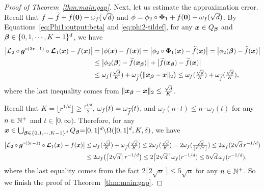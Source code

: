 \documentclass[nohyperref]{article}
\theoremstyle{plain}
\theoremstyle{definition}
\theoremstyle{remark}
\begin{document}
\begin{proof}[Proof of Theorem~\ref{thm:main:gap}]
Next, let us estimate the approximation error.
Recall that $f={\widetilde{f}}+f({\bm{0}})-\omega_f(\sqrt{d})$
 and $\phi=\phi_2\circ{\bm{\Phi}}_1+f({\bm{0}})-\omega_f(\sqrt{d})$. 
By Equations~\eqref{eq:Phi1:output:beta} and \eqref{eq:phi2-tildef}, for any ${\bm{x}}\in Q_{\bm{\beta}}$ and $\bmbeta\in \{0,1,\dotsc,K-1\}^d$, we have
\begin{equation*}
	\begin{split}
		\big|{\mathcal{L}}_2\circ {\bm{g}}^{\circ (3r-1)}\circ {\bm{\mathcal{L}}}_1({\bm{x}})-f({\bm{x}})\big|
		&=|\phi({\bm{x}})-f({\bm{x}})|
		=\big|\phi_2\circ{\bm{\Phi}}_1({\bm{x}})-{\widetilde{f}}({\bm{x}})\big|=\big|\phi_2({\bm{\beta}})-{\widetilde{f}}({\bm{x}})\big|\\
		&\le \big|\phi_2({\bm{\beta}})-{\widetilde{f}}({\bm{x}}_{\bm{\beta}})\big|+ \big|{\widetilde{f}}({\bm{x}}_{\bm{\beta}})-{\widetilde{f}}({\bm{x}})\big|\\
		&\le \omega_f(\tfrac{\sqrt{d}}{K})
		+\omega_{\widetilde{f}}\big(\|{\bm{x}}_{\bm{\beta}}-{\bm{x}}\|_2\big)
		\le   \omega_f(\tfrac{\sqrt{d}}{K}) + \omega_{\widetilde{f}}(\tfrac{\sqrt{d}}{K}),
	\end{split}
\end{equation*}
where the last inequality comes from $\|{\bm{x}}_{\bm{\beta}}-{\bm{x}}\|_2\le \tfrac{\sqrt{d}}{K}$.


Recall that  $K=\lfloor r^{1/d}\rfloor \ge    \tfrac{r^{1/d}}{2}$,  $\omega_f(t)=\omega_{\widetilde{f}}(t)$, and $\omega_f(n\cdot  t)\le n\cdot \omega_f(t)$ for any $n\in\N^+$ and $t\in [0,\infty)$. Therefore, for any $\bmx\in \bigcup_{\bm{\beta}\in \{0,1,\dotsc,K-1\}^d} Q_\bmbeta\black{=} [0,1]^d\backslash \Omega([0,1]^d,K,\delta)$, we have
\begin{equation*}
	\begin{split}
		\big|{\mathcal{L}}_2\circ {\bm{g}}^{\circ (3r-1)}\circ {\bm{\mathcal{L}}}_1({\bm{x}})-f({\bm{x}})\big|
		&\le  \omega_f(\tfrac{\sqrt{d}}{K}) + \omega_{\widetilde{f}}(\tfrac{\sqrt{d}}{K})
		\le 2 \omega_f(\tfrac{\sqrt{d}}{K})
		=2 \omega_f(\tfrac{\sqrt{d}}{\lfloor r^{1/d}\rfloor})\le  2 \omega_f(2\sqrt{d}\,r^{-1/d})\\
		&\le  2 \omega_f\big(\big\lceil 2\sqrt{d}\big\rceil\,r^{-1/d}\big)
		\le 2\big\lceil 2\sqrt{d}\,\big\rceil \omega_f(r^{-1/d})
		\le 5\sqrt{d}\,\omega_f(r^{-1/d}), 
	\end{split}
\end{equation*}
where the last equality comes from the fact $2\big\lceil 2\sqrt{n}\,\big\rceil\le 5\sqrt{n}$ for any $n\in \N^+$. 
So we finish the proof of Theorem~\ref{thm:main:gap}.
\end{proof}
\end{document}
